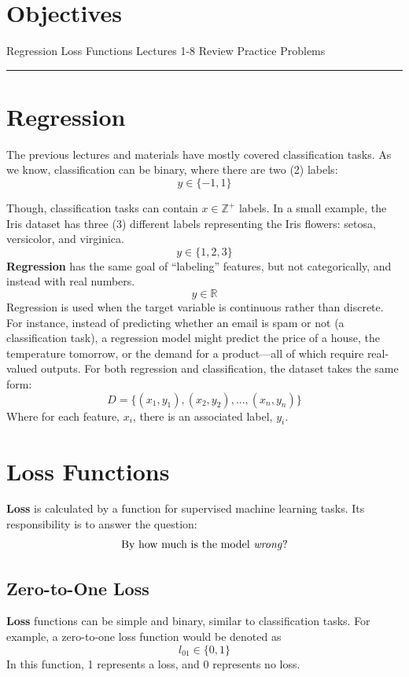 
\section*{Objectives}
\begin{outline}
    \1 Regression
    \1 Loss Functions
    \1 Lectures 1-8 Review
    \1 Practice Problems
\end{outline}

\rule[0.0051in]{\textwidth}{0.00025in}


\section{Regression}
The previous lectures and materials have mostly covered classification tasks. As we know, classification can be binary, where there are two (2) labels: 
\[
y \in \{-1, 1\}
\]

Though, classification tasks can contain $x\mathbb{\in Z^+}$ labels. In a small example, the Iris dataset has three (3) different labels representing the Iris flowers: setosa, versicolor, and virginica.
\[
y \in \{1, 2, 3\}
\]
\textbf{Regression} has the same goal of ``labeling'' features, but not categorically, and instead with real numbers.
\[
y \in \mathbb{R}
\]
Regression is used when the target variable is continuous rather than discrete. For instance, instead of predicting whether an email is spam or not (a classification task), a regression model might predict the price of a house, the temperature tomorrow, or the demand for a product—all of which require real-valued outputs.
For both regression and classification, the dataset takes the same form:
\[
D = \{(x_1, y_1), (x_2, y_2),...,(x_n, y_n)\}
\]
Where for each feature, $x_i$, there is an associated label, $y_i$.
\section{Loss Functions}
\textbf{Loss} is calculated by a function for supervised machine learning tasks. Its responsibility is to answer the question: 
\[
\text{By how much is the model \textit{wrong}?}
\]

\subsection{Zero-to-One Loss}
\textbf{Loss} functions can be simple and binary, similar to classification tasks. For example, a zero-to-one loss function would be denoted as
\[
l_{01} \in \{0, 1\}
\]
In this function, 1 represents a loss, and 0 represents no loss.

